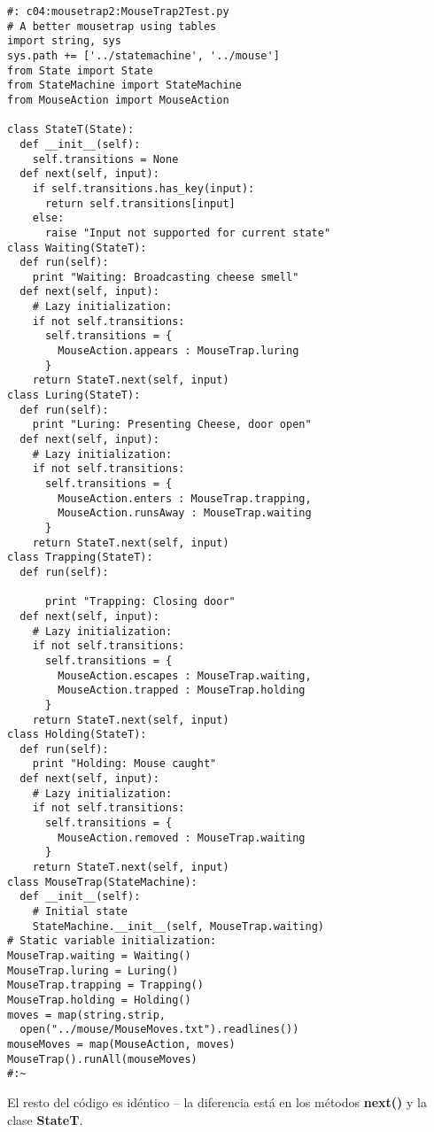  \begin{lstlisting}
#: c04:mousetrap2:MouseTrap2Test.py 
# A better mousetrap using tables 
import string, sys 
sys.path += ['../statemachine', '../mouse'] 
from State import State 
from StateMachine import StateMachine 
from MouseAction import MouseAction 

class StateT(State): 
  def __init__(self): 
    self.transitions = None 
  def next(self, input): 
    if self.transitions.has_key(input): 
      return self.transitions[input] 
    else: 
      raise "Input not supported for current state" 
class Waiting(StateT): 
  def run(self):  
    print "Waiting: Broadcasting cheese smell" 
  def next(self, input): 
    # Lazy initialization: 
    if not self.transitions: 
      self.transitions = {  
        MouseAction.appears : MouseTrap.luring  
      } 
    return StateT.next(self, input) 
class Luring(StateT): 
  def run(self): 
    print "Luring: Presenting Cheese, door open" 
  def next(self, input): 
    # Lazy initialization: 
    if not self.transitions: 
      self.transitions = { 
        MouseAction.enters : MouseTrap.trapping, 
        MouseAction.runsAway : MouseTrap.waiting 
      } 
    return StateT.next(self, input) 
class Trapping(StateT): 
  def run(self): 
  
      print "Trapping: Closing door" 
  def next(self, input): 
    # Lazy initialization: 
    if not self.transitions: 
      self.transitions = { 
        MouseAction.escapes : MouseTrap.waiting, 
        MouseAction.trapped : MouseTrap.holding 
      } 
    return StateT.next(self, input) 
class Holding(StateT): 
  def run(self): 
    print "Holding: Mouse caught" 
  def next(self, input): 
    # Lazy initialization: 
    if not self.transitions: 
      self.transitions = { 
        MouseAction.removed : MouseTrap.waiting 
      } 
    return StateT.next(self, input) 
class MouseTrap(StateMachine): 
  def __init__(self):  
    # Initial state 
    StateMachine.__init__(self, MouseTrap.waiting) 
# Static variable initialization: 
MouseTrap.waiting = Waiting() 
MouseTrap.luring = Luring() 
MouseTrap.trapping = Trapping() 
MouseTrap.holding = Holding() 
moves = map(string.strip,  
  open("../mouse/MouseMoves.txt").readlines()) 
mouseMoves = map(MouseAction, moves) 
MouseTrap().runAll(mouseMoves) 
#:~ 
 \end{lstlisting}
 
El resto del código es idéntico – la diferencia está en los métodos \textbf{next()} y la clase \textbf{StateT}.\newline

